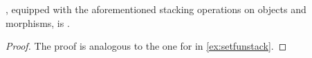 %
\begin{lemma}
    \PosL, equipped with the aforementioned stacking operations on objects and morphisms, is .
\end{lemma}
%
\begin{proof}
    The proof is analogous to the one for \SetL in \cref{ex:setfunstack}.
\end{proof}
